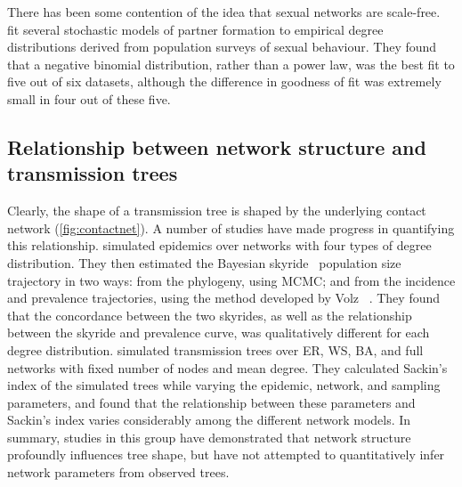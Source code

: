 There has been some contention of the idea that sexual networks are scale-free.
\textcite{handcock2004likelihood} fit several stochastic models of partner
formation to empirical degree distributions derived from population surveys of
sexual behaviour. They found that a negative binomial distribution, rather than
a power law, was the best fit to five out of six datasets, although the
difference in goodness of fit was extremely small in four out of these five.

\subsection{Relationship between network structure and transmission trees}

Clearly, the shape of a transmission tree is shaped by the underlying contact
network (\cref{fig:contactnet}). A number of studies have made progress in
quantifying this relationship. \textcite{o2010contact} simulated epidemics over
networks with four types of degree distribution. They then estimated the
Bayesian skyride~\autocite{minin2008smooth} population size trajectory in two
ways: from the phylogeny, using \gls{MCMC}; and from the incidence and
prevalence trajectories, using the method developed by Volz
\etal~\autocite{volz2009phylodynamics}. They found that the concordance between
the two skyrides, as well as the relationship between the skyride and
prevalence curve, was qualitatively different for each degree distribution.
\citeauthor{leventhal2012inferring} simulated transmission trees over \gls{ER},
\gls{WS}, \gls{BA}, and full networks with fixed number of nodes and mean
degree. They calculated Sackin's index of the simulated trees while varying the
epidemic, network, and sampling parameters, and found that the relationship
between these parameters and Sackin's index varies considerably among the
different network models. In summary, studies in this group have demonstrated
that network structure profoundly influences tree shape, but have not attempted
to quantitatively infer network parameters from observed trees.


